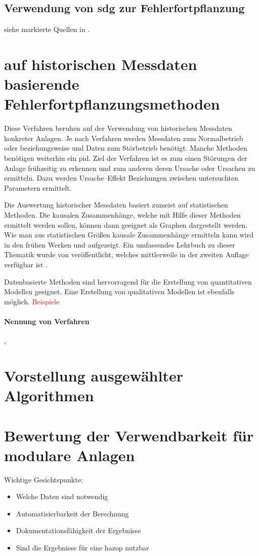 \subsection{Verwendung von \ac{sdg} zur Fehlerfortpflanzung}
siehe markierte Quellen in \cite{Boonthum_2014}.

\section{auf historischen Messdaten basierende Fehlerfortpflanzungsmethoden}\label{sec:fAna_dat}
Diese Verfahren beruhen auf der Verwendung von historischen Messdaten konkreter Anlagen. Je nach Verfahren werden Messdaten zum Normalbetrieb oder beziehungsweise und Daten zum St\"orbetrieb ben\"otigt. Manche Methoden ben\"otigen weiterhin ein \ac{pid}. Ziel der Verfahren ist es zum einen St\"orungen der Anlage fr\"uhzeitig zu erkennen und zum anderen deren Ursache oder Ursachen zu ermitteln. Dazu werden Ursache--Effekt Beziehungen zwischen untersuchten Parametern ermittelt.  

Die Auswertung historischer Messdaten basiert zumeist auf statistischen Methoden. Die kausalen Zusammenh\"ange, welche mit Hilfe dieser Methoden ermittelt werden sollen, k\"onnen dann geeignet als Graphen dargestellt werden. Wie man aus statistischen Gr\"o\ss{}en kausale Zusammenh\"ange ermitteln kann wird in den fr\"uhen Werken \textcite{Holland_1986} und  \textcite{Pearl_1995} aufgezeigt. Ein umfassendes Lehrbuch zu dieser Thematik wurde von \citeauthor{Pearl_2009} ver\"offentlicht, welches mittlerweile in der zweiten Auflage verf\"ugbar ist \cite{Pearl_2009}.

Datenbasierte Methoden sind hervorragend f\"ur die Erstellung von quantitativen Modellen geeignet. Eine Erstellung von qualitativen Modellen ist ebenfalls m\"oglich. \textcolor{red}{Beispiele}
\paragraph*{Nennung von Verfahren}
\cite{Zhang_2017}, \cite{Thornhill_2006}



\section{Vorstellung ausgew\"ahlter Algorithmen}
\section{Bewertung der Verwendbarkeit f\"ur modulare Anlagen}
Wichtige Gesichtspunkte:
\begin{itemize}
\item Welche Daten sind notwendig
\item Automatisierbarkeit der Berechnung
\item Dokumentationsf\"ahigkeit der Ergebnisse
\item Sind die Ergebnisse f\"ur eine \ac{hazop} nutzbar
\end{itemize}